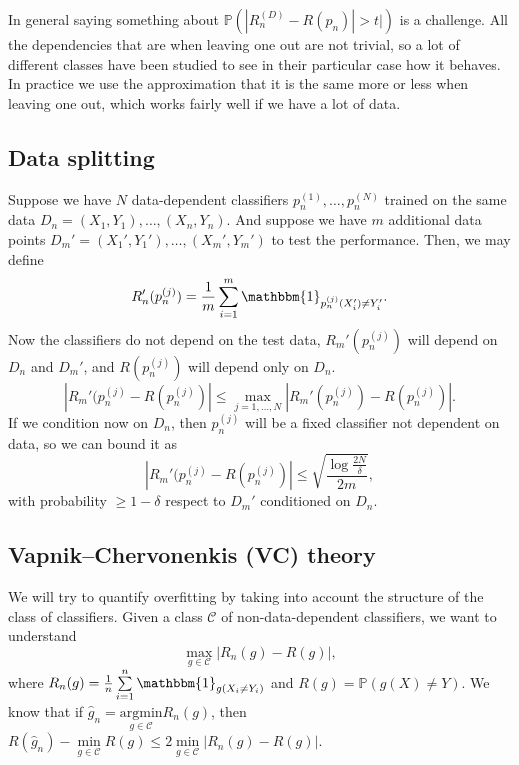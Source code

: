 \documentclass[11pt, english]{article}
\begin{document}
In general saying something about $\mathbb{P}(|R_n^{(D)}-R(p_n)|>t|)$ is a challenge. All the dependencies that are when leaving one out are not trivial, so a lot of different classes have been studied to see in their particular case how it behaves. In practice we use the approximation that it is the same more or less when leaving one out, which works fairly well if we have a lot of data.

\subsection{Data splitting}

Suppose we have $N$ data-dependent classifiers $p_n^{(1)},\dots,p_n^{(N)}$ trained on the same data $D_n=(X_1,Y_1),\dots,(X_n,Y_n)$. And suppose we have $m$ additional data points $D_m'=(X_1',Y_1'),\dots,(X_m',Y_m')$ to test the performance. Then, we may define \begin{equation}
	R_n'(p_n^{(j)})=\frac{1}{m}\sum\limits_{i=1}^m\mathbbm{1}_{p_n^{(j)}(X_i')\neq Y_i'}.
\end{equation}
Now the classifiers do not depend on the test data, $R_m'(p_n^{(j)})$ will depend on $D_n$ and $D_m'$, and $R(p_n^{(j)})$ will depend only on $D_n$.
\begin{equation}
	|R_m'(p_n^{(j)}-R(p_n^{(j)})|\leq \underset{j=1,\dots,N}{\max}|R_m'(p_n^{(j)})-R(p_n^{(j)})|.
\end{equation}
If we condition now on $D_n$, then $p_n^{(j)}$ will be a fixed classifier not dependent on data, so we can bound it as
\begin{equation}
	|R_m'(p_n^{(j)}-R(p_n^{(j)})|\leq \sqrt{\frac{\log\frac{2N}{\delta}}{2m}},
\end{equation}
with probability $\geq 1-\delta$ respect to $D_m'$ conditioned on $D_n$. \\

\subsection{Vapnik–Chervonenkis (VC) theory}

We will try to quantify overfitting by taking into account the structure of the class of classifiers. Given a class $\mathcal{C}$ of non-data-dependent classifiers, we want to understand 
\begin{equation}
	\underset{g\in\mathcal{C}}{\max}|R_n(g)-R(g)|,
\end{equation}
where $R_n(g)=\frac{1}{n}\sum\limits_{i=1}^n\mathbbm{1}_{g(X_i\neq Y_i)}$ and $R(g)=\mathbb{P}(g(X)\neq Y)$. We know that if $\hat{g}_n=\underset{g\in\mathcal{C}}{\text{argmin}}R_n(g)$, then $R(\hat{g}_n)-\underset{g\in\mathcal{C}}{\min}R(g)\leq2\underset{g\in\mathcal{C}}{\min}|R_n(g)-R(g)|$.\\
\end{document}
